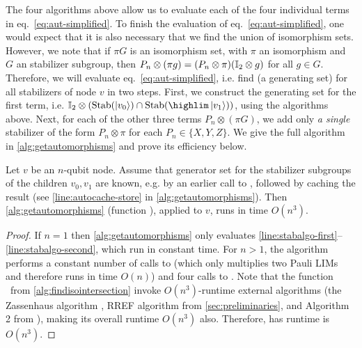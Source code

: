 The four algorithms above allow us to evaluate each of the four individual terms in eq.~\eqref{eq:aut-simplified}.
To finish the evaluation of eq.~\eqref{eq:aut-simplified}, one would expect that it is also necessary that we find the union of isomorphism sets.
However, we note that if $\pi G$ is an isomorphism set, with $\pi$ an isomorphism and $G$ an stabilizer subgroup, then $P_n \otimes (\pi g) = (P_n \otimes \pi) (\id[2] \otimes g)$ for all $g\in G$.
Therefore, we will evaluate eq.~\eqref{eq:aut-simplified}, i.e. find (a generating set) for all stabilizers of node $v$ in two steps.
First, we construct the generating set for the first term, i.e. $\id[2] \otimes ( \Aut(\ket{v_0}) \cap \Aut(\highlim \ket{v_1}) )$, using the algorithms above.
Next, for each of the other three terms $P_n \otimes (\pi G)$, we add only \textit{a single} stabilizer of the form $P_n \otimes \pi$ for each $P_n \in \{X, Y, Z\}$.
We give the full algorithm in \autoref{alg:getautomorphisms} and prove its efficiency below.


\begin{lemma}
    Let $v$ be an $n$-qubit node.
    Assume that generator set for the stabilizer subgroups of the children $v_0, v_1$ are known, e.g. by an earlier call to \getautomorphisms, followed by caching the result (see \autoref{line:autocache-store} in \autoref{alg:getautomorphisms}).
   Then \autoref{alg:getautomorphisms} (function \getautomorphisms), applied to $v$, runs in time $O(n^3)$.
\end{lemma}
\begin{proof}
    If $n=1$ then \autoref{alg:getautomorphisms} only evaluates \autoref{line:stabalgo-first}--\ref{line:stabalgo-second}, which run in constant time.
    For $n>1$, the algorithm performs a constant number of calls to \getsingleisomorphism (which only multiplies two Pauli LIMs and therefore runs in time $O(n)$) and four calls to \findisomorphismsetintersection.
    Note that the function \findisomorphismsetintersection~from \autoref{alg:findisointersection} invoke $O(n^3)$-runtime external algorithms (the Zassenhaus algorithm \cite{LUKS1997335}, RREF algorithm from \autoref{sec:preliminaries}, and Algorithm 2 from \cite{garcia2012efficient}), making its overall runtime $O(n^3)$ also.
    Therefore, \getautomorphisms has runtime is $O(n^3)$.
\end{proof}




